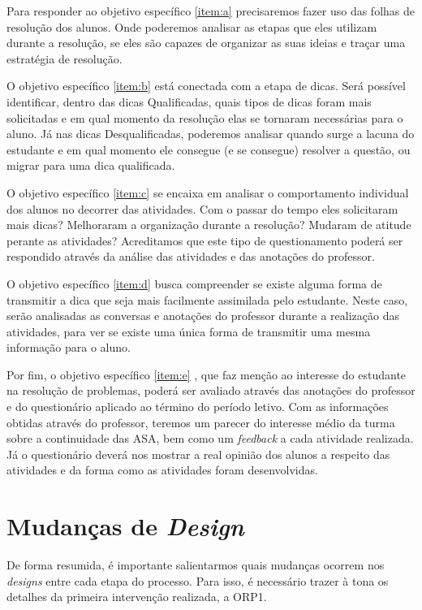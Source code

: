 Para responder ao objetivo específico \ref{item:a} precisaremos fazer uso das folhas de resolução dos alunos. Onde poderemos analisar as etapas que eles utilizam durante a resolução, se eles são capazes de organizar as suas ideias e traçar uma estratégia de resolução.

O objetivo específico \ref{item:b} está conectada com a etapa de dicas. Será possível identificar, dentro das dicas Qualificadas, quais tipos de dicas foram mais solicitadas e em qual momento da resolução elas se tornaram necessárias para o aluno. Já nas dicas Desqualificadas, poderemos analisar quando surge a lacuna do estudante e em qual momento ele consegue (e se consegue) resolver a questão, ou migrar para uma dica qualificada. 

O objetivo específico \ref{item:c} se encaixa em analisar o comportamento individual dos alunos no decorrer das atividades. Com o passar do tempo eles solicitaram mais dicas? Melhoraram a organização durante a resolução? Mudaram de atitude perante as atividades? Acreditamos que este tipo de questionamento poderá ser respondido através da análise das atividades e das anotações do professor. 

O objetivo específico \ref{item:d} busca compreender se existe alguma forma de transmitir a dica que seja mais facilmente assimilada pelo estudante. Neste caso, serão analisadas as conversas e anotações do professor durante a realização das atividades, para ver se existe uma única forma de transmitir uma mesma informação para o aluno. 

Por fim, o objetivo específico \ref{item:e} , que faz menção ao interesse do estudante na resolução de problemas, poderá ser avaliado através das anotações do professor e do questionário aplicado ao término do período letivo. Com as informações obtidas através do professor, teremos um parecer do interesse médio da turma sobre a continuidade das ASA, bem como um \textit{feedback} a cada atividade realizada. Já o questionário deverá nos mostrar a real opinião dos alunos a respeito das atividades e da forma como as atividades foram desenvolvidas. 

\section{Mudanças de \textit{Design}}

De forma resumida, é importante salientarmos quais mudanças ocorrem nos \textit{designs} entre cada etapa do processo. Para isso, é necessário trazer à tona os detalhes da primeira intervenção realizada, a ORP1.


